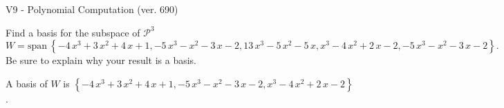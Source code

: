 \begin{exercise}
  \begin{exerciseTitle}V9 - Polynomial Computation (ver. 690)\end{exerciseTitle}
  \begin{exerciseStatement}
    Find a basis for the subspace of \(\mathcal{P}^3\) 
\[W=\mathrm{span}\ \left\{-4 \, x^{3} + 3 \, x^{2} + 4 \, x + 1 , -5 \, x^{3} - x^{2} - 3 \, x - 2 , 13 \, x^{3} - 5 \, x^{2} - 5 \, x , x^{3} - 4 \, x^{2} + 2 \, x - 2 , -5 \, x^{3} - x^{2} - 3 \, x - 2\right\}.\]
 Be sure to explain why your result is a basis.


  \end{exerciseStatement}
  \begin{exerciseAnswer}
   A basis of \(W\) is  \(\left\{-4 \, x^{3} + 3 \, x^{2} + 4 \, x + 1 , -5 \, x^{3} - x^{2} - 3 \, x - 2 , x^{3} - 4 \, x^{2} + 2 \, x - 2\right\}\).
  


  \end{exerciseAnswer}
\end{exercise}